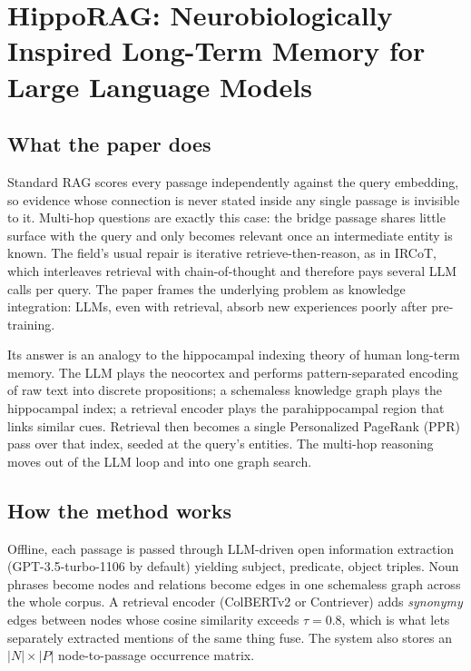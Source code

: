 \section{HippoRAG: Neurobiologically Inspired Long-Term Memory for Large Language Models}

\subsection{What the paper does}

Standard RAG scores every passage independently against the query embedding, so evidence whose connection is never stated inside any single passage is invisible to it. Multi-hop questions are exactly this case: the bridge passage shares little surface with the query and only becomes relevant once an intermediate entity is known. The field's usual repair is iterative retrieve-then-reason, as in IRCoT, which interleaves retrieval with chain-of-thought and therefore pays several LLM calls per query. The paper frames the underlying problem as knowledge integration: LLMs, even with retrieval, absorb new experiences poorly after pre-training.

Its answer is an analogy to the hippocampal indexing theory of human long-term memory. The LLM plays the neocortex and performs pattern-separated encoding of raw text into discrete propositions; a schemaless knowledge graph plays the hippocampal index; a retrieval encoder plays the parahippocampal region that links similar cues. Retrieval then becomes a single Personalized PageRank (PPR) pass over that index, seeded at the query's entities. The multi-hop reasoning moves out of the LLM loop and into one graph search.

\subsection{How the method works}

Offline, each passage is passed through LLM-driven open information extraction (GPT-3.5-turbo-1106 by default) yielding subject, predicate, object triples. Noun phrases become nodes and relations become edges in one schemaless graph across the whole corpus. A retrieval encoder (ColBERTv2 or Contriever) adds \emph{synonymy} edges between nodes whose cosine similarity exceeds $\tau = 0.8$, which is what lets separately extracted mentions of the same thing fuse. The system also stores an $|N| \times |P|$ node-to-passage occurrence matrix.

